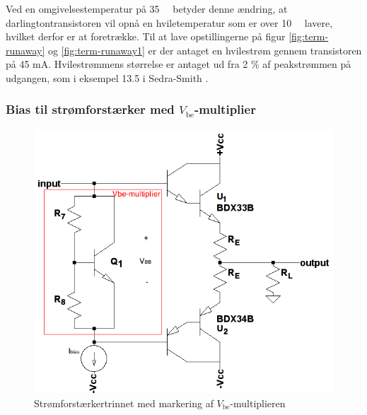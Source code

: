 Ved en omgivelsestemperatur på 35~\celsius~ betyder denne ændring, at darlingtontransistoren vil opnå en hviletemperatur som er over 10~\celsius~ lavere, hvilket derfor er at foretrække. Til at lave opstillingerne på figur \ref{fig:term-runaway} og \ref{fig:term-runaway1} er der antaget en hvilestrøm gennem transistoren på 45 mA. Hvilestrømmens størrelse er antaget ud fra 2 \% af peakstrømmen på udgangen, som i eksempel 13.5 i Sedra-Smith .


\subsubsection*{Bias til strømforstærker med $V_\mathrm{be}$-multiplier}

\begin{figure}[h]
\centering
\includegraphics[scale=.4]{teknisk/effektforstaerker/vbemultiplieropbygning.png}
\caption{Strømforstærkertrinnet med markering af $V_\mathrm{be}$-multiplieren}
\label{fig:vbemulti}
\end{figure}


